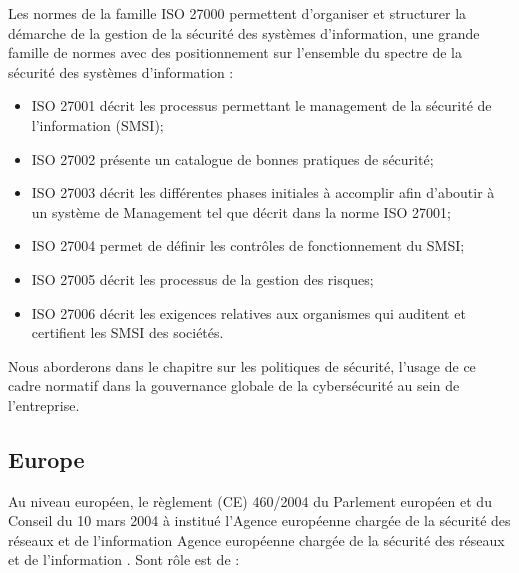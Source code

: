 Les normes de la famille ISO 27000 permettent d’organiser et structurer la démarche de la gestion de la sécurité des systèmes d’information, une grande famille de normes avec des  positionnement sur l'ensemble du spectre  de la sécurité des systèmes d'information : 

\begin{itemize}
  \item ISO 27001 décrit les processus permettant le management de la sécurité de l’information (SMSI);
  \item ISO 27002 présente un catalogue de bonnes pratiques de sécurité;
  \item ISO 27003 décrit les différentes phases initiales à accomplir afin d’aboutir à un système de Management tel que décrit dans la norme ISO 27001;
  \item ISO 27004 permet de définir les contrôles de fonctionnement du SMSI;
  \item ISO 27005 décrit les processus de la gestion des risques;
  \item ISO 27006 décrit les exigences relatives aux organismes qui auditent et certifient les SMSI des sociétés.
\end{itemize}

Nous aborderons dans le chapitre sur les politiques de sécurité, l'usage de ce cadre normatif dans la gouvernance globale de la cybersécurité au sein de l'entreprise.


\subsection{Europe}

Au niveau européen, le règlement (CE) 460/2004 du Parlement européen et du Conseil du 10 mars 2004 à institué l'Agence européenne chargée de la sécurité des réseaux et de l'information  Agence européenne chargée de la sécurité des réseaux et de l'information . Sont rôle est de : 

